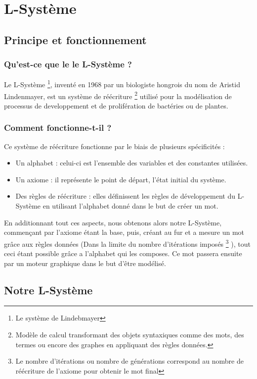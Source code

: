 \chapter{L-Système}

\section{Principe et fonctionnement}

\subsection{Qu'est-ce que le le L-Système ?}
Le L-Système \footnote{Le système de Lindebmayer}, inventé en 1968 par un biologiste hongrois du nom de Aristid Lindenmayer, est un système de réécriture \footnote{Modèle de calcul transformant des objets syntaxiques comme des mots, des termes ou encore des graphes en appliquant des règles données.} utilisé pour la modélisation de processus de developpement et de prolifération de bactéries ou de plantes.

\subsection{Comment fonctionne-t-il ?}
Ce système de réécriture fonctionne par le biais de plusieurs spécificités :
\begin{itemize}
    \item Un alphabet : celui-ci est l'ensemble des variables et des constantes utilisées.
    \item Un axiome : il représente le point de départ, l'état initial du système.
    \item Des règles de réécriture : elles définissent les règles de développement du L-Système en utilisant l'alphabet donné dans le but de créer un mot.
\end{itemize}
En additionnant tout ces aspects, nous obtenons alors notre L-Système, commençant par l'axiome étant la base, puis, créant au fur et a mesure un mot grâce aux règles données (Dans la limite du nombre d'itérations imposés \footnote{Le nombre d'itérations ou nombre de générations correspond au nombre de réécriture de l'axiome pour obtenir le mot final} ), tout ceci étant possible grâce a l'alphabet qui les composes.
Ce mot passera ensuite par un moteur graphique dans le but d'être modélisé.

\section{Notre L-Système}

